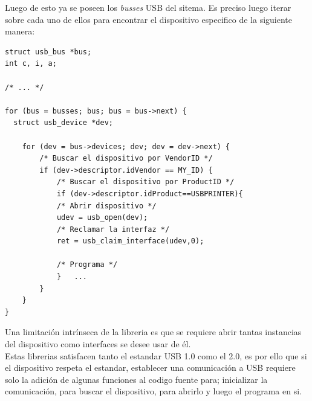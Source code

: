 Luego de esto ya se poseen los \emph{busses} USB del sitema. Es preciso luego
iterar sobre cada uno de ellos para encontrar el dispositivo especifico de la
siguiente manera:

\begin{lstlisting}
struct usb_bus *bus;
int c, i, a;
    
/* ... */
    
for (bus = busses; bus; bus = bus->next) {
  struct usb_device *dev;
    
    for (dev = bus->devices; dev; dev = dev->next) {
        /* Buscar el dispositivo por VendorID */
        if (dev->descriptor.idVendor == MY_ID) {
            /* Buscar el dispositivo por ProductID */
            if (dev->descriptor.idProduct==USBPRINTER){
            /* Abrir dispositivo */
            udev = usb_open(dev);
            /* Reclamar la interfaz */
            ret = usb_claim_interface(udev,0); 

            /* Programa */
            }	...
        }
    }
}
\end{lstlisting}

Una limitaci\'on intr\'inseca de la libreria es que se requiere abrir tantas
instancias del dispositivo como interfaces se desee usar de \'el.\\

Estas librerias satisfacen tanto el estandar USB 1.0 como el 2.0, es por ello
que si el dispositivo respeta el estandar, establecer una comunicaci\'on a
USB requiere solo la adici\'on de algunas funciones al codigo fuente para;
inicializar la comunicaci\'on, para buscar el dispositivo, para abrirlo y
luego el programa en si.


